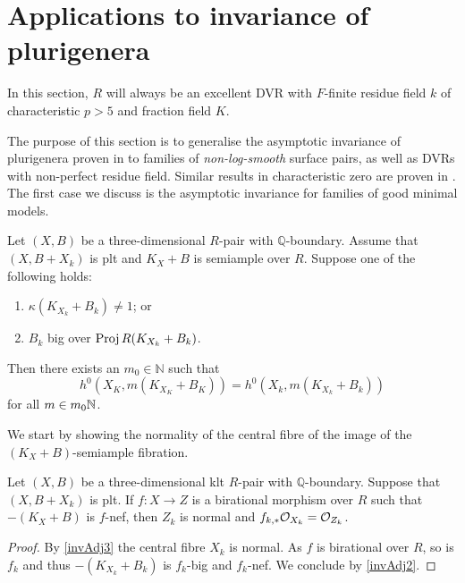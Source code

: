 \section{Applications to invariance of plurigenera}\label{s-inv-plurigenera}
	
	
	In this section, $R$ will always be an excellent DVR with $F$-finite residue field $k$ of characteristic $p>5$ and fraction field $K$. 
	
	The purpose of this section is to generalise the asymptotic invariance of plurigenera proven in \cite[Theorem 3.1]{EH} to families of \emph{non-log-smooth} surface pairs, as well as DVRs with non-perfect residue field. Similar results in characteristic zero are proven in \cite{HMX13, HMX18}.
	The first case we discuss is the asymptotic invariance for families of good minimal models.
	
	\begin{theorem}\label{thm:ADIOP_SA}
		Let $(X,B)$ be a three-dimensional $R$-pair with $\mathbb{Q}$-boundary.
		Assume that $(X,B+X_k)$ is plt and $K_X+B$ is semiample over $R$.
		Suppose one of the following holds:
		\begin{enumerate}
			\item $\kappa(K_{X_k}+B_k)\neq 1$; or
			\item  $B_k$ big over $\Proj R(K_{X_k}+B_k)$.
		\end{enumerate} 
		Then there exists an $m_{0} \in \mathbb{N}$ such that 
		$$h^0(X_K,m(K_{X_K}+B_K))=h^0(X_k,m(K_{X_k}+B_k))$$
		for all $m\in m_0\bN$.
	\end{theorem}
	
	We start by showing the normality of the central fibre of the image of the $(K_X+B)$-semiample fibration.
	
	\begin{proposition}\label{p-gen-case}
		Let $(X,B)$ be a three-dimensional klt $R$-pair with $\mathbb{Q}$-boundary.
		Suppose that $(X,B+X_{k})$ is plt. If $f \colon X \to Z$ is a birational morphism over $R$ such that $-(K_{X}+B)$ is $f$-nef, then $Z_k$ is normal and $f_{k,*}\ox[X_{k}]=\ox[Z_{k}]$.
	\end{proposition}
	
	\begin{proof}
		By \autoref{invAdj3} the central fibre $X_{k}$ is normal. 
		As $f$ is birational over $R$, so is $f_{k}$ and thus $-(K_{X_{k}}+B_{k})$ is $f_{k}$-big and $f_k$-nef. We conclude by \autoref{invAdj2}.
	\end{proof}
	
